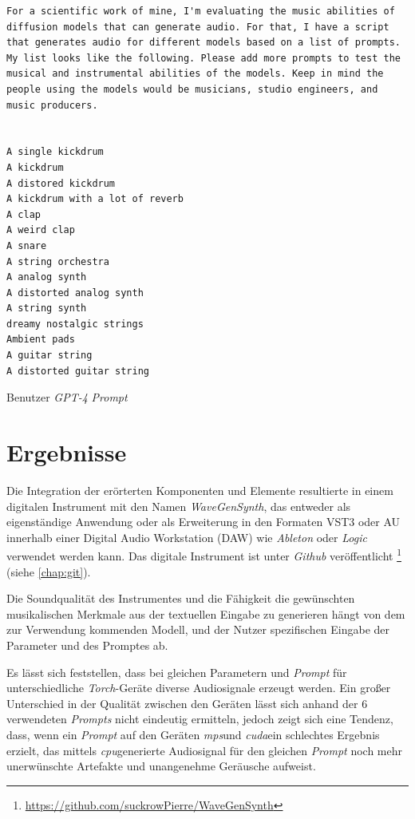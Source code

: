 \documentclass[
  a4paper,  %
  twoside,  %
  bibliography=totoc,
  headsepline,
  cleardoublepage=empty,
  parskip=half,
  draft=false
]{scrbook}
\begin{document}
\begin{Listing}
\begin{lstlisting}[style=gpt]
For a scientific work of mine, I'm evaluating the music abilities of diffusion models that can generate audio. For that, I have a script that generates audio for different models based on a list of prompts. My list looks like the following. Please add more prompts to test the musical and instrumental abilities of the models. Keep in mind the people using the models would be musicians, studio engineers, and music producers. 


A single kickdrum
A kickdrum
A distored kickdrum
A kickdrum with a lot of reverb
A clap
A weird clap
A snare
A string orchestra
A analog synth
A distorted analog synth
A string synth
dreamy nostalgic strings
Ambient pads
A guitar string
A distorted guitar string
\end{lstlisting}
    \caption{Benutzer \emph{GPT-4} \emph{Prompt}}
  \label{lst:prompt}
\end{Listing}

\chapter{Ergebnisse}
Die Integration der erörterten Komponenten und Elemente resultierte in einem digitalen Instrument mit den Namen \emph{WaveGenSynth}, das entweder als eigenständige Anwendung oder als Erweiterung in den Formaten VST3 oder AU innerhalb einer Digital Audio Workstation (DAW) wie \emph{Ableton} \cite{noauthor_ableton_nodate} oder \emph{Logic} \cite{noauthor_logic_nodate} verwendet werden kann. Das digitale Instrument ist unter \emph{Github} \cite{noauthor_github_nodate} veröffentlicht \footnote{\url{https://github.com/suckrowPierre/WaveGenSynth}} (siehe \ref{chap:git}). 

Die Soundqualität des Instrumentes und die Fähigkeit die gewünschten musikalischen Merkmale aus der textuellen Eingabe zu generieren hängt von dem zur Verwendung kommenden Modell, und der Nutzer spezifischen Eingabe der Parameter und des Promptes ab. 



Es lässt sich feststellen, dass bei gleichen Parametern und \emph{Prompt} für unterschiedliche \emph{Torch}-Geräte diverse Audiosignale erzeugt werden. Ein großer Unterschied in der Qualität zwischen den Geräten lässt sich anhand der $6$ verwendeten \emph{Prompts} nicht eindeutig ermitteln, jedoch zeigt sich eine Tendenz, dass, wenn ein \emph{Prompt} auf den Geräten \glqq\emph{mps}\grqq und \glqq\emph{cuda}\grqq ein schlechtes Ergebnis erzielt, das mittels \glqq\emph{cpu}\grqq generierte Audiosignal für den gleichen \emph{Prompt} noch mehr unerwünschte Artefakte und unangenehme Geräusche aufweist.
\end{document}
